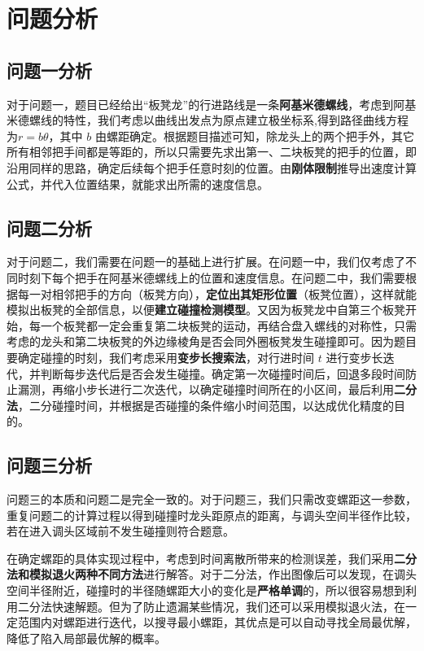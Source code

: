 \documentclass[zihao=-4, UTF8]{article}		%
\theoremstyle{MyLineTheoremStyle} %
\theoremstyle{MyBlockTheoremStyle} %
\theoremstyle{MySubsubsectionStyle} %
\begin{document}
\section{问题分析}
\subsection{问题一分析}
对于问题一，题目已经给出“板凳龙”的行进路线是一条\textbf{阿基米德螺线}，考虑到阿基米德螺线的特性，我们考虑以曲线出发点为原点建立极坐标系,得到路径曲线方程为$r=b\theta$，其中 $b$ 由螺距确定。根据题目描述可知，除龙头上的两个把手外，其它所有相邻把手间都是等距的，所以只需要先求出第一、二块板凳的把手的位置，即沿用同样的思路，确定后续每个把手任意时刻的位置。由\textbf{刚体限制}推导出速度计算公式，并代入位置结果，就能求出所需的速度信息。

\subsection{问题二分析}
对于问题二，我们需要在问题一的基础上进行扩展。在问题一中，我们仅考虑了不同时刻下每个把手在阿基米德螺线上的位置和速度信息。在问题二中，我们需要根据每一对相邻把手的方向（板凳方向），\textbf{定位出其矩形位置}（板凳位置），这样就能模拟出板凳的全部信息，以便\textbf{建立碰撞检测模型}。又因为板凳龙中自第三个板凳开始，每一个板凳都一定会重复第二块板凳的运动，再结合盘入螺线的对称性，只需考虑的龙头和第二块板凳的外边缘棱角是否会同外圈板凳发生碰撞即可。因为题目要确定碰撞的时刻，我们考虑采用\textbf{变步长搜索法}，对行进时间 $t$ 进行变步长迭代，并判断每步迭代后是否会发生碰撞。确定第一次碰撞时间后，回退多段时间防止漏测，再缩小步长进行二次迭代，以确定碰撞时间所在的小区间，最后利用\textbf{二分法}，二分碰撞时间，并根据是否碰撞的条件缩小时间范围，以达成优化精度的目的。

\subsection{问题三分析}
问题三的本质和问题二是完全一致的。对于问题三，我们只需改变螺距这一参数，重复问题二的计算过程以得到碰撞时龙头距原点的距离，与调头空间半径作比较，若在进入调头区域前不发生碰撞则符合题意。

在确定螺距的具体实现过程中，考虑到时间离散所带来的检测误差，我们采用\textbf{二分法和模拟退火两种不同方法}进行解答。对于二分法，作出图像后可以发现，在调头空间半径附近，碰撞时的半径随螺距大小的变化是\textbf{严格单调}的，所以很容易想到利用二分法快速解题。但为了防止遗漏某些情况，我们还可以采用模拟退火法，在一定范围内对螺距进行迭代，以搜寻最小螺距，其优点是可以自动寻找全局最优解，降低了陷入局部最优解的概率。
\end{document}
